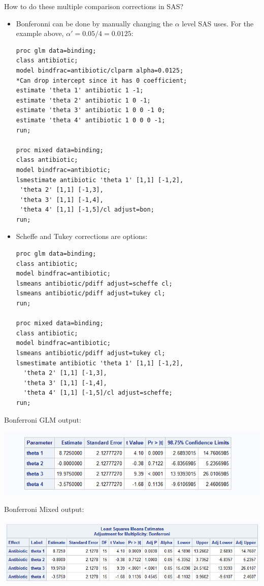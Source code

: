 How to do these multiple comparison corrections in SAS?\\
\begin{itemize}
\item Bonferonni can be done by manually changing the $\alpha$ level SAS uses.  For the example above, $\alpha'=0.05/4=0.0125$:\\
\begin{small}
\begin{verbatim}
proc glm data=binding;
class antibiotic;
model bindfrac=antibiotic/clparm alpha=0.0125;
*Can drop intercept since it has 0 coefficient;
estimate 'theta 1' antibiotic 1 -1; 
estimate 'theta 2' antibiotic 1 0 -1;
estimate 'theta 3' antibiotic 1 0 0 -1 0;
estimate 'theta 4' antibiotic 1 0 0 0 -1;
run;

proc mixed data=binding;
class antibiotic;
model bindfrac=antibiotic;
lsmestimate antibiotic 'theta 1' [1,1] [-1,2],
 'theta 2' [1,1] [-1,3],
 'theta 3' [1,1] [-1,4],
 'theta 4' [1,1] [-1,5]/cl adjust=bon;
run;
\end{verbatim}
\end{small}

\item Scheffe and Tukey corrections are options:
\begin{small}
\begin{verbatim}
proc glm data=binding;
class antibiotic;
model bindfrac=antibiotic;
lsmeans antibiotic/pdiff adjust=scheffe cl;
lsmeans antibiotic/pdiff adjust=tukey cl;
run;

proc mixed data=binding;
class antibiotic;
model bindfrac=antibiotic;
lsmeans antibiotic/pdiff adjust=tukey cl;
lsmestimate antibiotic 'theta 1' [1,1] [-1,2],
  'theta 2' [1,1] [-1,3],
  'theta 3' [1,1] [-1,4],
  'theta 4' [1,1] [-1,5]/cl adjust=scheffe;
run;
\end{verbatim}
\end{small}
\end{itemize}

\newpage

Bonferroni GLM output:
\begin{center}
\includegraphics[scale=0.8]{BindFracBon}
\end{center}
Bonferroni Mixed output:
\begin{center}
\includegraphics[scale=0.8]{BindFracBonMixed}
\end{center}

